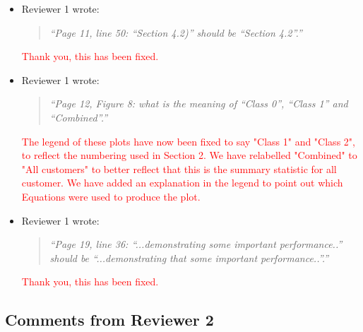 \documentclass{article}
\begin{document}
\begin{itemize}
\item Reviewer 1 wrote:
\begin{quote}\it
``Page 11, line 50: ``Section 4.2)'' should be ``Section 4.2''.''
\end{quote}

\textcolor{red}{Thank you, this has been fixed.}

\item Reviewer 1 wrote:
\begin{quote}\it
``Page 12, Figure 8: what is the meaning of ``Class 0'', ``Class 1'' and ``Combined''.''
\end{quote}

\textcolor{red}{The legend of these plots have now been fixed to say "Class 1" and "Class 2", to reflect the numbering used in Section 2. We have relabelled "Combined" to "All customers" to better reflect that this is the summary statistic for all customer. We have added an explanation in the legend to point out which Equations were used to produce the plot.}

\item Reviewer 1 wrote:
\begin{quote}\it
``Page 19, line 36: ``...demonstrating some important performance..'' should be ``...demonstrating that some important performance..''.''
\end{quote}

\textcolor{red}{Thank you, this has been fixed.}

\end{itemize}


\subsection{Comments from Reviewer 2}
\end{document}
